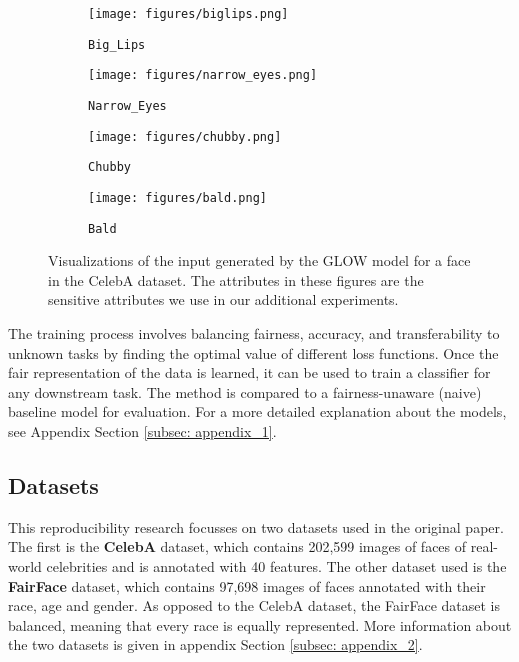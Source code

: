 \begin{figure}[H]
\centering
\begin{subfigure}{.5\textwidth}
  \centering
  \texttt{[image: figures/biglips.png]}
  \caption{\texttt{Big\_Lips}}
  \label{fig:biglips}
\end{subfigure}%
\begin{subfigure}{.5\textwidth}
  \centering
  \texttt{[image: figures/narrow\_eyes.png]}
  \caption{\texttt{Narrow\_Eyes}}
  \label{fig:narroweyes}
\end{subfigure}
\begin{subfigure}{.5\textwidth}
  \centering
  \texttt{[image: figures/chubby.png]}
  \caption{\texttt{Chubby}}
  \label{fig:chubby_example}
\end{subfigure}%
\begin{subfigure}{.5\textwidth}
  \centering
  \texttt{[image: figures/bald.png]}
  \caption{\texttt{Bald}}
  \label{fig:bald_example}
\end{subfigure}
\caption{Visualizations of the input generated by the GLOW model for a face in the CelebA dataset. The attributes in these figures are the sensitive attributes we use in our additional experiments.}
\label{fig:glow_input}
\end{figure}

The training process involves balancing fairness, accuracy, and transferability to unknown tasks by finding the optimal value of different loss functions. Once the fair representation of the data is learned, it can be used to train a classifier for any downstream task. The method is compared to a fairness-unaware (naive) baseline model for evaluation. For a more detailed explanation about the models, see Appendix Section \ref{subsec: appendix_1}.


\subsection{Datasets}

This reproducibility research focusses on two datasets used in the original paper. The first is the \textbf{CelebA} \cite{liu2015deep} dataset, which contains 202,599 images of faces of real-world celebrities and is annotated with 40 features. The other dataset used is the \textbf{FairFace} \cite{karkkainen2021fairface} dataset, which contains 97,698 images of faces annotated with their race, age and gender. As opposed to the CelebA dataset, the FairFace dataset is balanced, meaning that every race is equally represented. More information about the two datasets is given in appendix Section \ref{subsec: appendix_2}.

